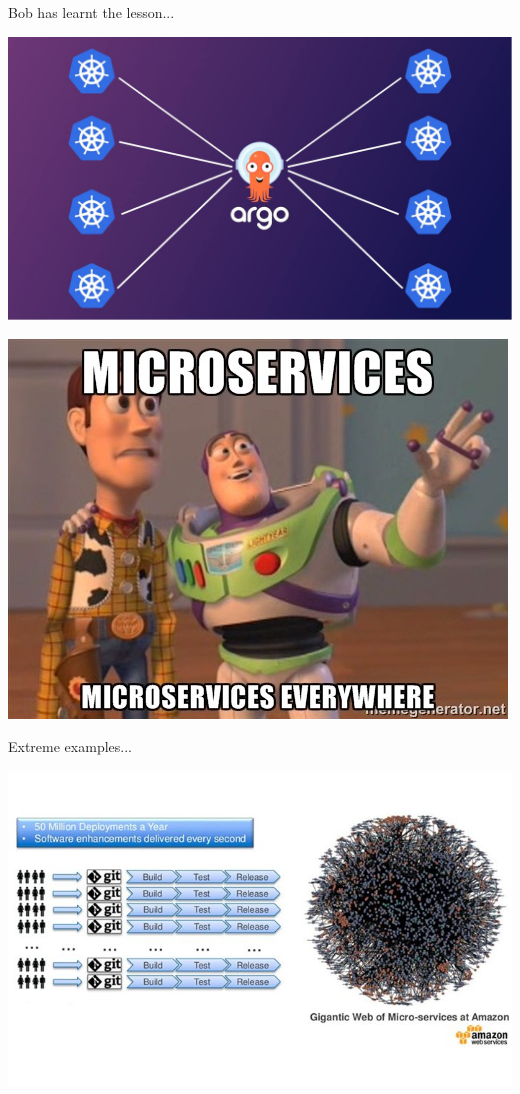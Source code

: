 \begin{frame}{Bob has learnt the lesson...}
    \begin{center}
        \includegraphics[width=.9\textwidth]{./assets/argocd}
    \end{center}
\end{frame}


\begin{frame}
    \begin{center}
        \includegraphics[width=.7\textwidth]{./assets/microservice_love.jpeg}
    \end{center}
\end{frame}

\begin{frame}{Extreme examples...}
    \begin{center}
        \includegraphics[width=.8\textwidth]{./assets/aws_microservices}
    \end{center}
\end{frame}

